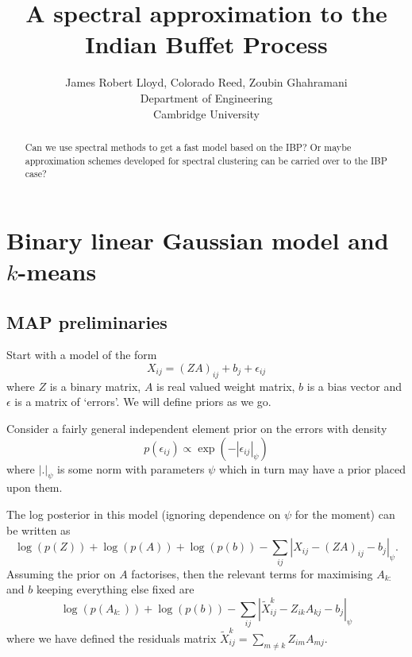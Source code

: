 \documentclass{article}
\title{
A spectral approximation to the Indian Buffet Process
}
\author{
James Robert Lloyd, Colorado Reed, Zoubin Ghahramani\\
Department of Engineering\\
Cambridge University\\
}
\numberwithin{equation}{section}
\numberwithin{thm}{section}
\def\IBP{Z}
\def\Weights{A}
\def\Data{X}
\def\Residuals{\tilde{X}}
\def\errors{\epsilon}
\def\bias{b}
\begin{document}
\maketitle

\begin{abstract}
Can we use spectral methods to get a fast model based on the IBP?
Or maybe approximation schemes developed for spectral clustering can be carried over to the IBP case?
\end{abstract}

\section{Binary linear Gaussian model and $k$-means}

\subsection{MAP preliminaries}

Start with a model of the form
\begin{equation}
\Data_{ij} = (\IBP\Weights)_{ij} + \bias_{j} + \errors_{ij}
\end{equation}
where $\IBP$ is a binary matrix, $\Weights$ is real valued weight matrix, $\bias$ is a bias vector and $\epsilon$ is a matrix of `errors'.
We will define priors as we go.

Consider a fairly general independent element prior on the errors with density
\begin{equation}
p(\errors_{ij}) \propto \exp(-|\errors_{ij}|_\psi)
\end{equation}
where $|.|_{\psi}$ is some norm with parameters $\psi$ which in turn may have a prior placed upon them.

The log posterior in this model (ignoring dependence on $\psi$ for the moment) can be written as
\begin{equation}
\log(p(\IBP)) + \log(p(\Weights)) + \log(p(\bias)) - \sum_{ij}|\Data_{ij} - (\IBP\Weights)_{ij} - \bias_j|_\psi.
\end{equation}
Assuming the prior on $\Weights$ factorises, then the relevant terms for maximising $\Weights_{k:}$ and $\bias$ keeping everything else fixed are
\begin{equation}
\log(p(\Weights_{k:})) + \log(p(\bias)) - \sum_{ij} |\Residuals^k_{ij} - \IBP_{ik}\Weights_{kj} - \bias_j|_\psi
\end{equation}
where we have defined the residuals matrix $\Residuals^k_{ij} = \sum_{m \neq k}\IBP_{im}\Weights_{mj}$.
\end{document}
